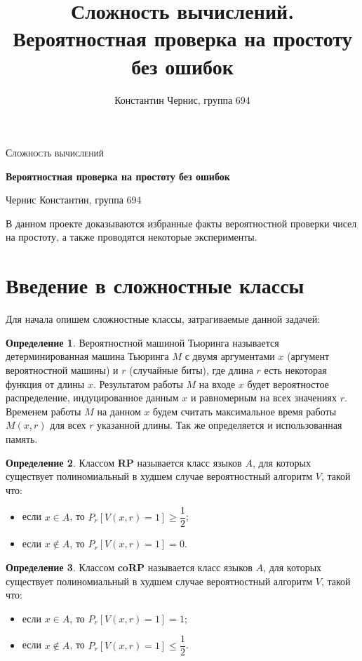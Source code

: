 \documentclass[12pt]{article}
\title{Сложность вычислений. \\
Вероятностная проверка на простоту без ошибок}
\date{}
\author{Константин Чернис, группа 694}
\theoremstyle{definition}
\newtheorem{Def}{Определение}
\numberwithin{Def}{section}
\numberwithin{Th}{section}
\numberwithin{St}{section}
\begin{document}
\begin{titlepage}
	\centering
	{\scshape\Large Сложность вычислений\par}
	\vspace{1.5cm}
	{\huge\bfseries Вероятностная проверка на простоту без ошибок\par}
	\vspace{2cm}
	{\Large Чернис Константин, группа 694\par}
	\newpage
\end{titlepage}
\tableofcontents
\newpage

В данном проекте доказываются избранные факты вероятностной
проверки чисел на простоту, а также проводятся некоторые 
эксперименты.

\section{Введение в сложностные классы}

Для начала опишем сложностные классы, затрагиваемые данной задачей:

\begin{Def}
	Вероятностной машиной Тьюринга называется детерминированная машина Тьюринга $M$ с
	двумя аргументами $x$ (аргумент вероятностной машины) и $r$ (случайные биты), где
	длина $r$ есть некоторая функция от длины $x$. Результатом работы $M$ на входе $x$
	будет вероятностое распределение, индуцированное данным $x$ и равномерным на всех
	значениях $r$. Временем работы $M$ на данном $x$ будем считать максимальное время работы
	$M(x,r)$ для всех $r$ указанной длины. Так же определяется и использованная память.
\end{Def}

\begin{Def}
	Классом \textbf{RP} называется класс языков $A$, для которых существует полиномиальный
	в худшем случае вероятностный алгоритм $V$, такой что:
	
	\begin{itemize}
		\item если $x\in A$, то $P_r[V(x,r)=1]\geqslant\dfrac 12$;
		\item если $x\notin A$, то $P_r[V(x,r)=1]=0$.
	\end{itemize}
\end{Def}

\begin{Def}
	Классом \textbf{coRP} называется класс языков $A$, для которых существует полиномиальный
	в худшем случае вероятностный алгоритм $V$, такой что:
	
	\begin{itemize}
		\item если $x\in A$, то $P_r[V(x,r)=1]=1$;
		\item если $x\notin A$, то $P_r[V(x,r)=1]\leqslant\dfrac 12$.
	\end{itemize}	
\end{Def}
	
\end{document}
